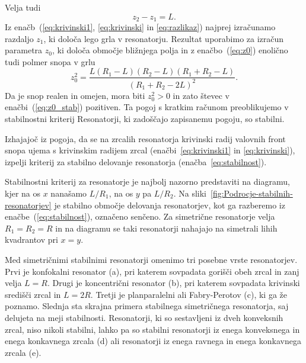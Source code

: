 Velja tudi 
\begin{equation}
z_{2}-z_{1}=L.
\label{eq:razlikaz}
\end{equation}
Iz  enačb~(\ref{eq:krivinski1}, \ref{eq:krivinski} in \ref{eq:razlikaz}) 
najprej izračunamo razdaljo $z_{1}$, ki določa
lego grla v resonatorju. Rezultat uporabimo za izračun parametra $z_{0}$, ki določa
območje bližnjega polja in z enačbo~(\ref{eq:z0}) enolično tudi polmer snopa v grlu
\begin{equation}
z_{0}^{2}=\frac{L(R_{1}-L)(R_{2}-L)(R_{1}+R_{2}-L)}{(R_{1}+R_{2}-2L)^{2}}.
\label{eq:z0_stab}
\end{equation}
Da je snop realen in omejen, mora biti $z_{0}^{2}>0$ in zato števec
v enačbi~(\ref{eq:z0_stab}) pozitiven. Ta pogoj s kratkim računom preoblikujemo
v stabilnostni kriterij
Resonatorji, ki zadoščajo zapisanemu pogoju, so stabilni. 

\begin{naloga}
Izhajajoč iz pogoja, da se na zrcalih resonatorja krivinski radij valovnih front snopa ujema s krivinskim
radijem zrcal (enačbi~\ref{eq:krivinski1} in \ref{eq:krivinski}), izpelji 
kriterij za stabilno delovanje resonatorja 
(enačba~\ref{eq:stabilnost}).
\end{naloga}

Stabilnostni kriterij za resonatorje je najbolj nazorno predstaviti na diagramu, 
kjer na os $x$ nanašamo $L/R_{1}$, na os $y$ pa $L/R_{2}$. Na 
sliki~\ref{fig:Podrocje-stabilnih-resonatorjev} je stabilno območje delovanja 
resonatorjev, kot ga razberemo iz enačbe~(\ref{eq:stabilnost}), označeno senčeno.
Za simetrične resonatorje 
velja $R_{1}=R_{2}=R$ in na diagramu se taki resonatorji nahajajo na simetrali 
lihih kvadrantov pri $x=y$. 

Med simetričnimi stabilnimi resonatorji omenimo tri posebne vrste resonatorjev.
Prvi je konfokalni resonator (a), 
pri katerem sovpadata gorišči obeh zrcal in zanj velja $L=R$. Drugi je 
koncentrični resonator (b), 
pri katerem sovpadata krivinski središči zrcal in $L=2R$.
Tretji je planparalelni ali Fabry-Perotov (c), ki ga že poznamo. 
Slednja sta skrajna primera stabilnega simetričnega resonatorja, saj delujeta na meji
stabilnosti. 
Resonatorji, ki so sestavljeni iz dveh konveksnih zrcal, niso nikoli stabilni, lahko
pa so stabilni resonatorji iz enega konveksnega in enega konkavnega zrcala (d)
ali resonatorji iz enega ravnega in enega konkavnega zrcala (e). 

